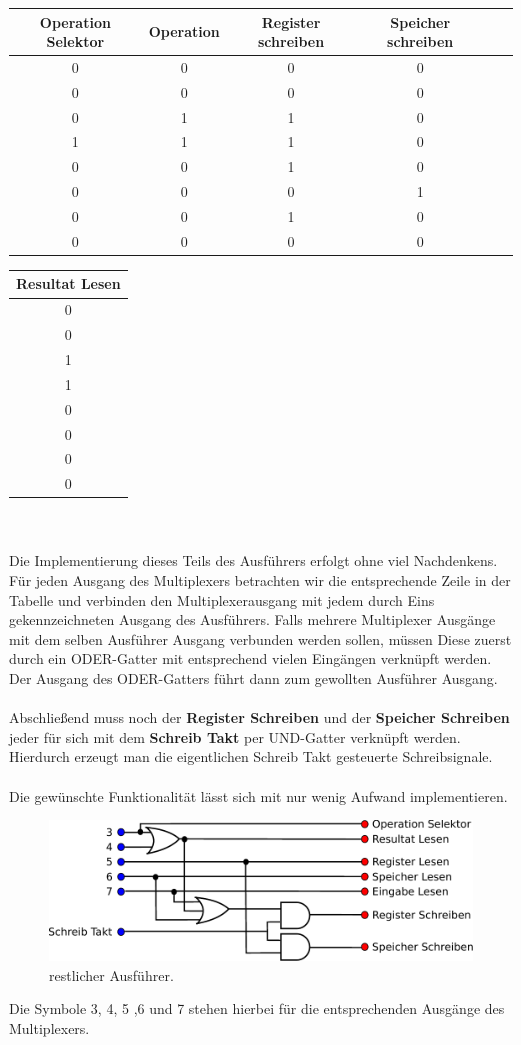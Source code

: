 \documentclass[11pt,a4paper,leqno]{report}
\numberwithin{equation}{chapter}
\begin{document}
\begin{center}
	\begin{tabular}{|c|c|c|c|c|c|}
		Operation Selektor & Operation & Register schreiben & Speicher schreiben \\
		\hline
		0 & 0 & 0 & 0\\
		0 & 0 & 0 & 0\\
		0 & 1 & 1 & 0\\
		1 & 1 & 1 & 0\\
		0 & 0 & 1 & 0\\
		0 & 0 & 0 & 1\\
		0 & 0 & 1 & 0\\
		0 & 0 & 0 & 0\\
	\end{tabular}  
\end{center}
\begin{tabular}{|c|}
		Resultat Lesen \\
		\hline
		0\\
		0\\
		1\\
		1\\
		0\\
		0\\
		0\\
		0\\
\end{tabular}\\  
\\
Die Implementierung dieses Teils des Ausf\"uhrers erfolgt ohne viel Nachdenkens. Für jeden Ausgang des Multiplexers betrachten wir die entsprechende Zeile in der Tabelle und verbinden den Multiplexerausgang mit jedem durch Eins gekennzeichneten Ausgang des Ausf\"uhrers.
Falls mehrere Multiplexer Ausg\"ange mit dem selben Ausf\"uhrer Ausgang verbunden werden sollen, m\"ussen Diese zuerst durch ein ODER-Gatter mit entsprechend vielen Eing\"angen verkn\"upft werden. Der Ausgang des ODER-Gatters f\"uhrt dann zum gewollten Ausf\"uhrer Ausgang.\\
\\
Abschlie\ss{}end muss noch der \textbf{Register Schreiben} und der \textbf{Speicher Schreiben} jeder f\"ur sich mit dem \textbf{Schreib Takt} per UND-Gatter verkn\"upft werden. Hierdurch erzeugt man die eigentlichen Schreib Takt gesteuerte Schreibsignale.\\
\\
Die gew\"unschte Funktionalit\"at l\"asst sich mit nur wenig Aufwand implementieren.
\begin{figure}[H]
	\begin{center}
		\includegraphics[scale=0.7]{aus_2.pdf}
		\caption{restlicher Ausf\"uhrer.}
	\end{center}
\end{figure}
\noindent
Die Symbole 3, 4, 5 ,6 und 7 stehen hierbei f\"ur die entsprechenden Ausg\"ange des Multiplexers.
\end{document}
